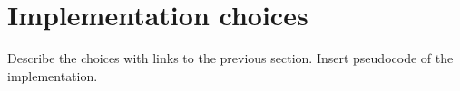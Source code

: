 \section{Implementation choices}
\label{sec:03-implementation}
Describe the choices with links to the previous section.
Insert pseudocode of the implementation.